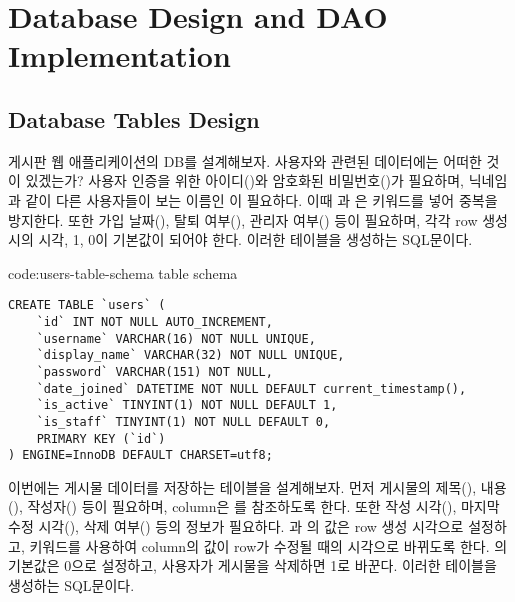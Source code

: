 \section{Database Design and DAO Implementation}\label{sect:web-app-db}

\subsection*{Database Tables Design}

게시판 웹 애플리케이션의 DB를 설계해보자. 사용자와 관련된 데이터에는 어떠한 것이 있겠는가? 사용자 인증을 위한 아이디()와 암호화된 비밀번호()가 필요하며, 닉네임과 같이 다른 사용자들이 보는 이름인 이 필요하다. 이때 과 은  키워드를 넣어 중복을 방지한다. 또한 가입 날짜(), 탈퇴 여부(), 관리자 여부() 등이 필요하며, 각각 row 생성 시의 시각, 1, 0이 기본값이 되어야 한다. \는 이러한  테이블을 생성하는 SQL문이다.

\begin{code}{code:users-table-schema}{ table schema}
\begin{verbatim}
CREATE TABLE `users` (
    `id` INT NOT NULL AUTO_INCREMENT,
    `username` VARCHAR(16) NOT NULL UNIQUE,
    `display_name` VARCHAR(32) NOT NULL UNIQUE,
    `password` VARCHAR(151) NOT NULL,
    `date_joined` DATETIME NOT NULL DEFAULT current_timestamp(),
    `is_active` TINYINT(1) NOT NULL DEFAULT 1,
    `is_staff` TINYINT(1) NOT NULL DEFAULT 0,
    PRIMARY KEY (`id`)
) ENGINE=InnoDB DEFAULT CHARSET=utf8;
\end{verbatim}
\end{code}

이번에는 게시물 데이터를 저장하는  테이블을 설계해보자. 먼저 게시물의 제목(), 내용(), 작성자() 등이 필요하며,  column은 를 참조하도록 한다. 또한 작성 시각(), 마지막 수정 시각(), 삭제 여부() 등의 정보가 필요하다. 과 의 값은 row 생성 시각으로 설정하고,  키워드를 사용하여 column의 값이 row가 수정될 때의 시각으로 바뀌도록 한다. 의 기본값은 0으로 설정하고, 사용자가 게시물을 삭제하면 1로 바꾼다. \는 이러한  테이블을 생성하는 SQL문이다.

